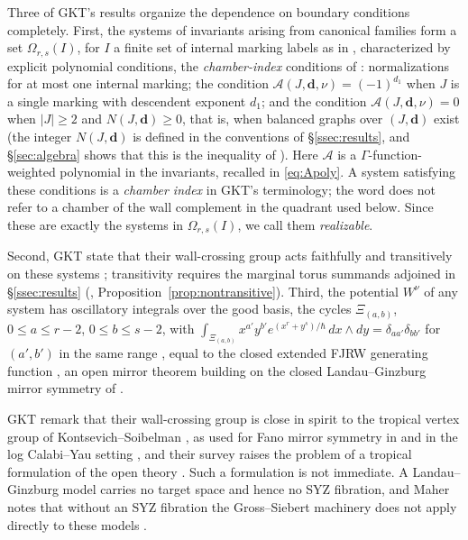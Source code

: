 \documentclass[11pt]{amsart}
\theoremstyle{definition}
\theoremstyle{remark}
\newcommand{\Ascr}{\mathcal{A}}
\newcommand{\Om}{\Omega_{r,s}}
\begin{document}
Three of GKT's results organize the dependence on boundary conditions
completely. First, the systems
of invariants arising from canonical families form a set $\Om(I)$, for $I$ a
finite set of internal marking labels as in \cite{GKT}, characterized by
explicit polynomial conditions, the \emph{chamber-index} conditions of
\cite[Def.~3.47, Cor.~5.14]{GKT}: normalizations for at most one internal
marking; the condition $\Ascr(J,\mathbf d,\nu)=(-1)^{d_1}$ when $J$ is a single
marking with descendent exponent $d_1$; and the condition
$\Ascr(J,\mathbf d,\nu)=0$ when $|J|\ge2$ and $N(J,\mathbf d)\ge0$, that is,
when balanced graphs over $(J,\mathbf d)$ exist (the integer
$N(J,\mathbf d)$ is defined in the conventions of \S\ref{ssec:results}, and
\S\ref{sec:algebra}
shows that this is the inequality of \cite[Def.~3.47]{GKT}).  Here $\Ascr$ is a
$\Gamma$-function-weighted polynomial in the invariants, recalled in
\eqref{eq:Apoly}.  A system satisfying these
conditions is a \emph{chamber index} in GKT's terminology; the word does not
refer to a chamber of the wall complement in the quadrant used below.  Since
these are exactly the systems in $\Om(I)$, we call them \emph{realizable}.

Second,
GKT state that their wall-crossing group acts faithfully and transitively on
these systems \cite[Thm.~4.27 and Cor.~5.14]{GKT}; transitivity requires the
marginal torus summands adjoined in \S\ref{ssec:results}
(\cite[Prop.~1.4 and Rem.~3.1]{note}, Proposition~\ref{prop:nontransitive}).
Third, the
potential $W^{\nu}$ of any system has oscillatory integrals over the good
basis, the cycles $\Xi_{(a,b)}$, $0\le a\le r-2$, $0\le b\le s-2$, with
$\int_{\Xi_{(a,b)}}x^{a'}y^{b'}e^{(x^r+y^s)/\hbar}\,dx\wedge dy
=\delta_{aa'}\delta_{bb'}$ for $(a',b')$ in the same range \cite[(4.3)]{GKT}, equal to the closed extended FJRW
generating function
\cite[Thm.~0.3]{GKT}, an open mirror theorem building on the closed
Landau--Ginzburg mirror symmetry of \cite{LLSS,HLSW}.

GKT remark \cite[Rem.~0.8]{GKT} that their wall-crossing group is
close in spirit to the tropical vertex group of Kontsevich--Soibelman \cite{KS06},
as used for Fano mirror symmetry in \cite{GPS10,Gross10} and in the log
Calabi--Yau setting \cite{GHK15}, and their survey raises
the problem of a tropical formulation of the open theory \cite{GKTsurvey}. Such a
formulation is not immediate. A Landau--Ginzburg model carries no target space and
hence no SYZ fibration, and Maher notes that without an SYZ fibration the
Gross--Siebert machinery does not apply directly to these models
\cite[Rem.~5.1.1]{Maher}.
\end{document}
